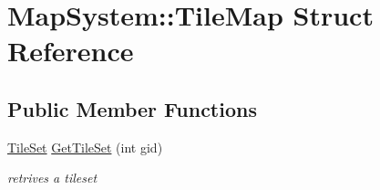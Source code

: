 \hypertarget{struct_map_system_1_1_tile_map}{}\section{Map\+System\+:\+:Tile\+Map Struct Reference}
\label{struct_map_system_1_1_tile_map}
\subsection*{Public Member Functions}
\begin{DoxyCompactItemize}
\item 
\mbox{\label{struct_map_system_1_1_tile_map_a6e2a93c63352cf894f659b9f9a6e442e}} 
\mbox{\hyperlink{struct_map_system_1_1_tile_set}{Tile\+Set}} \mbox{\hyperlink{struct_map_system_1_1_tile_map_a6e2a93c63352cf894f659b9f9a6e442e}{Get\+Tile\+Set}} (int gid)
\begin{DoxyCompactList}\small\item\em retrives a tileset \end{DoxyCompactList}\end{DoxyCompactItemize}
